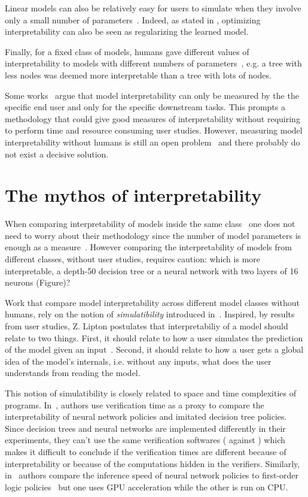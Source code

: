 Linear models can also be relatively easy for users to simulate when they involve only a small number of parameters~\citep{study-4}.
Indeed, as stated in \citep{study-0}, optimizing interpretability can also be seen as regularizing the learned model. 

Finally, for a fixed class of models, humans gave different values of interpretability to models with different numbers of parameters~\citep{study-4}, e.g. a tree with less nodes was deemed more interpretable than a tree with lots of nodes.

Some works~\cite{lipton,rigourous} argue that model interpretability can only be measured by the the specific end user and only for the specific downstream tasks.
This prompts a methodology that could give good measures of interpretability without requiring to perform time and resource consuming user studies.
However, measuring model interpretability without humans is still an open problem~\cite{glanois-survey} and there probably do not exist a decisive solution.

\section{The mythos of interpretability}\label{res:lipton}
When comparing interpretability of models inside the same class~\cite{murtree,blosson,pystreed,vanderlinden2024optimalgreedydecisiontrees,sympol,viper,topin2021iterative} one does not need to worry about their methodology since the number of model parameters is enough as a measure~\cite{study-4}.
However comparing the interpretability of models from different classes, without user studies, requires caution: which is more interpretable, a depth-50 decision tree or a neural network with two layers of 16 neurons (Figure)?

Work that compare model interpretability across different model classes without humans, rely on the notion of \textit{simulatibility} introduced in~\cite{lipton}.
Inspired, by results from user studies, Z. Lipton postulates that interpretabiliy of a model should relate to two things.
First, it should relate to how a user simulates the prediction of the model given an input~\cite{study-6,study-5}.
Second, it should relate to how a user gets a global idea of the model's internals, i.e. without any inputs, what does the user understands from reading the model.

This notion of simulatibility is closely related to space and time complexities of programs.
In~\cite{viper}, authors use verification time as a proxy to compare the interpretability of neural network policies and imitated decision tree policies.
Since decision trees and neural networks are implemented differently in their experiments, they can't use the same verification softwares (\cite{z3} against \cite{maraboupy}) which makes it difficult to conclude if the verification times are different because of interpretability or because of the computations hidden in the verifiers.
Similarly, in~\cite{insight} authors compare the inference speed of neural network policies to first-order logic policies~\cite{nduge} but one uses GPU acceleration while the other is run on CPU.

